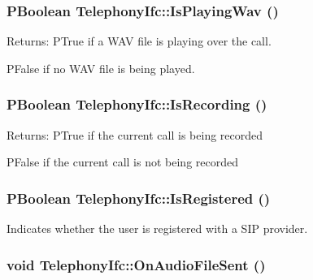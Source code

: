 \hypertarget{classTelephonyIfc_a471fa455406339841ed30bddedb7dab}{
\subsubsection[{IsPlayingWav}]{\setlength{\rightskip}{0pt plus 5cm}PBoolean TelephonyIfc::IsPlayingWav ()}}
\label{classTelephonyIfc_a471fa455406339841ed30bddedb7dab}


\begin{Desc}
\item[Returns:]PTrue if a WAV file is playing over the call. 

PFalse if no WAV file is being played. \end{Desc}
\hypertarget{classTelephonyIfc_4acdd44e7af7967ed53cdf9d47dc0c27}{
\subsubsection[{IsRecording}]{\setlength{\rightskip}{0pt plus 5cm}PBoolean TelephonyIfc::IsRecording ()}}
\label{classTelephonyIfc_4acdd44e7af7967ed53cdf9d47dc0c27}


\begin{Desc}
\item[Returns:]PTrue if the current call is being recorded 

PFalse if the current call is not being recorded \end{Desc}
\hypertarget{classTelephonyIfc_20e9a9dd2df97b6c50aa1e19191c890a}{
\subsubsection[{IsRegistered}]{\setlength{\rightskip}{0pt plus 5cm}PBoolean TelephonyIfc::IsRegistered ()}}
\label{classTelephonyIfc_20e9a9dd2df97b6c50aa1e19191c890a}


Indicates whether the user is registered with a SIP provider. 

\hypertarget{classTelephonyIfc_95f4177c87b299ab8dd0a2a13a319e0e}{
\subsubsection[{OnAudioFileSent}]{\setlength{\rightskip}{0pt plus 5cm}void TelephonyIfc::OnAudioFileSent ()}}
\label{classTelephonyIfc_95f4177c87b299ab8dd0a2a13a319e0e}



